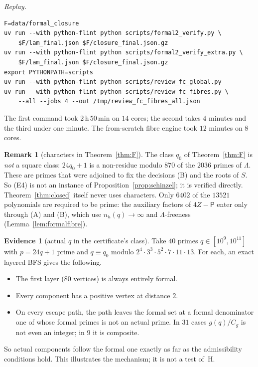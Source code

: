 \documentclass[11pt,reqno]{amsart}
\theoremstyle{definition}
\newtheorem{remark}[theorem]{Remark}
\newtheorem{evidence}[theorem]{Evidence}
\newcommand{\Pp}{\mathsf P}
\begin{document}
\emph{Replay.}
{\small
\begin{verbatim}
F=data/formal_closure
uv run --with python-flint python scripts/formal2_verify.py \
    $F/lam_final.json $F/closure_final.json.gz
uv run --with python-flint python scripts/formal2_verify_extra.py \
    $F/lam_final.json $F/closure_final.json.gz
export PYTHONPATH=scripts
uv run --with python-flint python scripts/review_fc_global.py
uv run --with python-flint python scripts/review_fc_fibres.py \
    --all --jobs 4 --out /tmp/review_fc_fibres_all.json
\end{verbatim}}
The first command took $2$\,h\,$50$\,min on $14$ cores; the second takes
$4$ minutes and the third under one minute.  The from-scratch fibre
engine took $12$ minutes on $8$ cores.

\begin{remark}[characters in Theorem~\ref{thm:F}]\label{rem:Fsquare}
The class $q_0$ of Theorem~\ref{thm:F} is \emph{not} a square class: $24q_0+1$
is a non-residue modulo $870$ of the $2036$ primes of $\Lambda$.  These are
primes that were adjoined to fix the decisions (B) and the roots of $S$.
So (E4) is not an instance of Proposition~\ref{prop:schinzel}; it is
verified directly.  Theorem~\ref{thm:closed} itself never uses characters.
Only $6402$ of the $13521$ polynomials are required to be prime: the
auxiliary factors of $4Z-\Pp$ enter only through (A) and (B), which use
$n_h(q)\to\infty$ and $\Lambda$-freeness (Lemma~\ref{lem:formalfibre}).
\end{remark}

\begin{evidence}[actual $q$ in the certificate's class]\label{ev:realq}
Take $40$ primes $q\in[10^9,10^{11}]$ with $p=24q+1$ prime and
$q\equiv q_0$ modulo $2^4\cdot3^3\cdot5^2\cdot7\cdot11\cdot13$.  For each, an
exact layered BFS gives the following.
\begin{itemize}
\item The first layer ($80$ vertices) is always entirely formal.
\item Every component has a positive vertex at distance $2$.
\item On every escape path, the path leaves the formal set at a formal
denominator one of whose formal primes is not an actual prime.  In $31$
cases $g(q)/C_g$ is not even an integer; in $9$ it is composite.
\end{itemize}
So actual components follow the formal one exactly as far as the
admissibility conditions hold.  This illustrates the mechanism; it is not a
test of~H.
\end{evidence}
\end{document}
